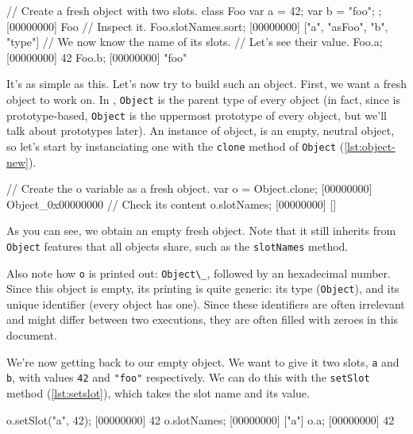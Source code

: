 \begin{urbiscript}[caption=Inspecting an \urbi object,label=lst:object-slots]
// Create a fresh object with two slots.
class Foo { var a = 42; var b = "foo"; };
[00000000] Foo
// Inspect it.
Foo.slotNames.sort;
[00000000] ["a", "asFoo", "b", "type"]
// We now know the name of its slots.
// Let's see their value.
Foo.a;
[00000000] 42
Foo.b;
[00000000] "foo"
\end{urbiscript}

It's as simple as this. Let's now try to build such an object. First,
we want a fresh object to work on. In \urbi, \texttt{Object} is the
parent type of every object (in fact, since \urbi is prototype-based,
\texttt{Object} is the uppermost prototype of every object, but we'll
talk about prototypes later). An instance of object, is an empty,
neutral object, so let's start by instanciating one with the
\texttt{clone} method of \texttt{Object} (\autoref{lst:object-new}).

\begin{urbiscript}[caption=Instanciating a new object,
  label=lst:object-new, name=object-slots]
// Create the o variable as a fresh object.
var o = Object.clone;
[00000000] Object_0x00000000
// Check its content
o.slotNames;
[00000000] []
\end{urbiscript}

As you can see, we obtain an empty fresh object. Note that it still
inherits from \texttt{Object} features that all objects share, such as
the \texttt{slotNames} method.

Also note how \lstinline{o} is printed out: \lstinline{Object\_}, followed by an
hexadecimal number. Since this object is empty, its printing is quite
generic: its type (\lstinline{Object}), and its unique identifier (every
\urbi object has one). Since these identifiers are often irrelevant
and might differ between two executions, they are often filled with
zeroes in this document.

We're now getting back to our empty object. We want to give it two
slots, \texttt{a} and \texttt{b}, with values \lstinline|42| and
\lstinline|"foo"| respectively. We can do this with the
\texttt{setSlot} method (\autoref{lst:setslot}), which takes the slot name and
its value.

\begin{urbiscript}[caption=Defining slots, label=lst:setslot,
  name=object-slots]
o.setSlot("a", 42);
[00000000] 42
o.slotNames;
[00000000] ["a"]
o.a;
[00000000] 42
\end{urbiscript}

